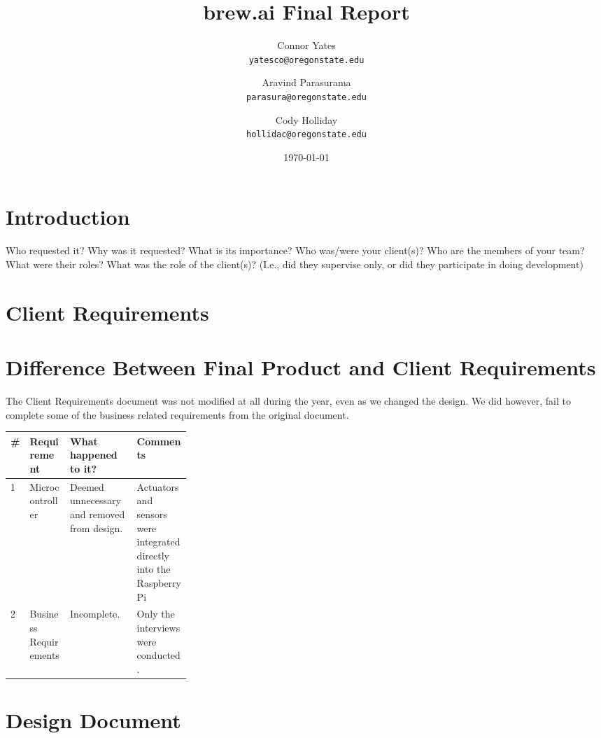 \documentclass[draftclsnofoot,onecolumn,letterpaper,10pt]{IEEEtran}
\author{Connor Yates\\
\texttt{yatesco@oregonstate.edu\\}
\and
Aravind Parasurama\\
\texttt{parasura@oregonstate.edu\\}
\and
Cody Holliday\\
\texttt{hollidac@oregonstate.edu\\}}
\date{\today}
\title{brew.ai Final Report}
\begin{document}
\maketitle

\newpage
\tableofcontents
\newpage

\section{Introduction}

Who requested it?
Why was it requested?
What is its importance?
Who was/were your client(s)?
Who are the members of your team?
What were their roles?
What was the role of the client(s)? (I.e., did they supervise only, or did they participate in doing development)



\section{Client Requirements}

\section{Difference Between Final Product and Client Requirements}



The Client Requirements document was not modified at all during the year, even as we changed the design.
We did however, fail to complete some of the business related requirements from the original document.

\begin{center}
\begin{tabular}{ lll p{0.3\linewidth} }
 \# & Requirement & What happened to it? & Comments \\
\hline
 1 & Microcontroller & Deemed unnecessary and removed from design. & Actuators and sensors  were integrated directly into the Raspberry Pi \\ 
 2 & Business Requirements & Incomplete. & Only the interviews were conducted. \\  
\end{tabular}
\end{center}

\section{Design Document}

\end{document}
